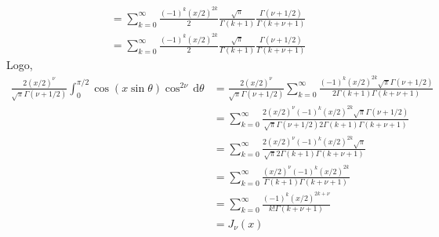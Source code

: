 \documentclass[a4paper,12pt, leqno, answers]{exam}
\begin{document}
\begin{questions}
\begin{solution}
\begin{align*}
            &= \sum_{k = 0}^\infty \frac{(-1)^k (x/2)^{2k}}{2} \frac{\sqrt{\pi}}{\Gamma(k + 1)} \frac{\Gamma(\nu + 1/2)}{\Gamma(k + \nu + 1)} \\
            &= \sum_{k = 0}^\infty \frac{(-1)^k (x/2)^{2k}}{2} \frac{\sqrt{\pi}}{\Gamma(k + 1)} \frac{\Gamma(\nu + 1/2)}{\Gamma(k + \nu + 1)}
        \end{align*}
        Logo,
        \begin{align*}
            \frac{2 (x/2)^\nu}{\sqrt{\pi} \Gamma(\nu + 1/2)} \int_0^{\pi/2} \cos(x \sin \theta) \cos^{2 \nu} \,\mathrm{d}\theta &= \frac{2 (x/2)^\nu}{\sqrt{\pi} \Gamma(\nu + 1/2)} \sum_{k = 0}^\infty \frac{(-1)^k (x/2)^{2k} \sqrt{\pi} \Gamma(\nu + 1/2)}{2 \Gamma(k + 1) \Gamma(k + \nu + 1)} \\
            &= \sum_{k = 0}^\infty \frac{2 (x/2)^\nu (-1)^k (x/2)^{2k} \sqrt{\pi} \Gamma(\nu + 1/2)}{\sqrt{\pi} \Gamma(\nu + 1/2) 2 \Gamma(k + 1) \Gamma(k + \nu + 1)} \\
            &= \sum_{k = 0}^\infty \frac{2 (x/2)^\nu (-1)^k (x/2)^{2k} \sqrt{\pi}}{\sqrt{\pi} 2 \Gamma(k + 1) \Gamma(k + \nu + 1)} \\
            &= \sum_{k = 0}^\infty \frac{(x/2)^\nu (-1)^k (x/2)^{2k}}{\Gamma(k + 1) \Gamma(k + \nu + 1)} \\
            &= \sum_{k = 0}^\infty \frac{(-1)^k (x/2)^{2k + \nu}}{k! \Gamma(k + \nu + 1)} \\
            &= J_\nu(x)
        \end{align*}
    \end{solution}


\end{questions}
\end{document}
